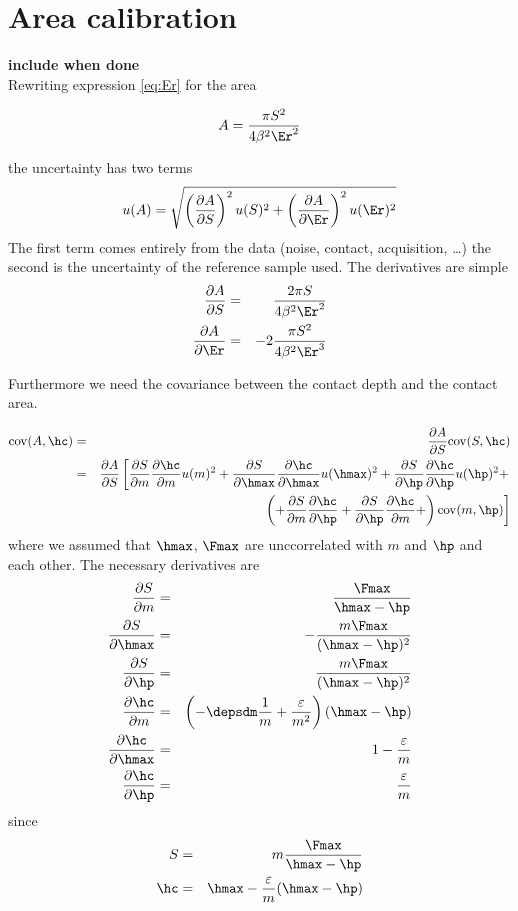 \section{Area calibration}
{\Large \bf include when done} \\
Rewriting expression \eqref{eq:Er} for the area 

\begin{equation}
A = \frac{\pi S^2}{4\beta^2 \Er^2}
\end{equation}

the uncertainty has two terms
\begin{equation}
u(A) = \sqrt{ \left( \frac{\partial A}{\partial S}\right)^2 u(S)^2 + \left( \frac{\partial A}{\partial \Er}\right)^2 u(\Er)^2 }
\end{equation}
The first term comes entirely from the data (noise, contact, acquisition, \dots) the second is the uncertainty of the reference sample used.
The derivatives are simple
\begin{eqnarray}
\frac{\partial A}{\partial S} &=& \frac{2 \pi S}{4\beta^2 \Er^2} \\
\frac{\partial A}{\partial \Er} &=& -2\frac{\pi S^2}{4\beta^2  \Er^3}
\end{eqnarray}

Furthermore we need the covariance between the contact depth and the contact area.

\begin{eqnarray}
\mathrm{cov} (A, \hc) &=& \frac{\partial A}{\partial S} \mathrm{cov} (S, \hc) \\
&=& \frac{\partial A}{\partial S} \left[
\frac{\partial S}{\partial m}\frac{\partial \hc}{\partial m} u(m)^2 +
\frac{\partial S}{\partial \hmax}\frac{\partial \hc}{\partial \hmax} u(\hmax)^2 +
\frac{\partial S}{\partial \hp}\frac{\partial \hc}{\partial \hp} u(\hp)^2 + \right.\\
&& \left.\left( +
\frac{\partial S}{\partial m}\frac{\partial \hc}{\partial \hp}  +
\frac{\partial S}{\partial \hp}\frac{\partial \hc}{\partial m}  +
\right) \mathrm{cov}(m, \hp)
\right]
\end{eqnarray}
where we assumed that $\hmax$, $\Fmax$ are unccorrelated with $m$ and $\hp$ and each other.
The necessary derivatives are
\begin{eqnarray}
\frac{\partial S}{\partial m} &=& \frac{ \Fmax}{\hmax-\hp} \\
\frac{\partial S}{\partial \hmax} &=&  -\frac{m \Fmax}{(\hmax-\hp)^2} \\
\frac{\partial S}{\partial \hp} &=& \frac{m \Fmax}{(\hmax-\hp)^2}\\
\frac{\partial \hc}{\partial m} &=& \left(-\depsdm \frac1m + \frac{\varepsilon}{m^2} \right) (\hmax-\hp)\\
\frac{\partial \hc}{\partial \hmax} &=& 1- \frac{\varepsilon}{m}\\
\frac{\partial \hc}{\partial \hp} &=& \frac{\varepsilon}{m}
\end{eqnarray}
since
\begin{eqnarray*}
 S &=& m \frac{\Fmax}{\hmax -\hp} \\
 \hc &=& \hmax - \frac{\varepsilon}{m} ( \hmax - \hp)
\end{eqnarray*}
